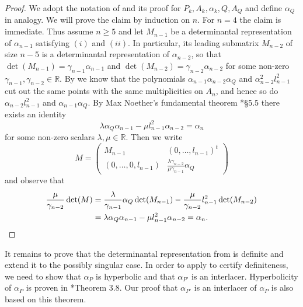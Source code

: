 \documentclass[a4paper,10pt]{amsart}
\theoremstyle{definition}
\theoremstyle{plain}
\newcommand{\R}{{\mathbb R}}
\begin{document}
\begin{proof}
 We adopt the notation of  and its proof for $P_k, A_k, \alpha_k, Q, A_Q$ and define $\alpha_Q$ in analogy. 
 We will prove the claim by induction on $n$. For $n=4$ the claim is immediate. Thus assume $n\geq5$ and let $M_{n-1}$ be a determinantal representation of $\alpha_{n-1}$ satisfying $(i)$ and $(ii)$. In particular, its leading submatrix $M_{n-2}$ of size $n-5$ is a determinantal representation of $\alpha_{n-2}$, so that $\det(M_{n-1}) = \gamma_{n-1}\alpha_{n-1}$ and $\det(M_{n-2}) = \gamma_{n-2}\alpha_{n-2}$ for some non-zero $\gamma_{n-1},\gamma_{n-2}\in\R$. 
 By  we know that the polynomials $\alpha_{n-1}\alpha_{n-2}\alpha_Q$ and $\alpha_{n-2}^2l_{n-1}^2$ cut out the same points with the same multiplicities on $A_n$, and hence so do $\alpha_{n-2}l_{n-1}^2$ and $\alpha_{n-1}\alpha_Q$. By Max Noether's fundamental theorem \cite{Fulton2008Curves}*{\S5.5} there exists an identity
 \begin{equation*}
     \lambda\alpha_Q\alpha_{n-1} - \mu l_{n-1}^2\alpha_{n-2} = \alpha_n
 \end{equation*}
 for some non-zero scalars $\lambda,\mu\in\R$.  Then we write
 \begin{equation*}
     M = \begin{pmatrix}
         M_{n-1} & (0, \dots, l_{n-1})^t \\
         (0, \dots, 0, l_{n-1}) & \frac{\lambda\gamma_{n-2}}{\mu\gamma_{n-1}}\alpha_Q
     \end{pmatrix}
 \end{equation*}
 and observe that
 \begin{equation*}
 \begin{split}
     \frac{\mu}{\gamma_{n-2}}\det(M) & = \frac{\lambda}{\gamma_{n-1}}\alpha_Q\det(M_{n-1}) - \frac{\mu}{\gamma_{n-2}}l_{n-1}^2\det(M_{n-2})  \\
     &= \lambda\alpha_Q\alpha_{n-1} - \mu l_{n-1}^2\alpha_{n-2} = \alpha_n.\qedhere
 \end{split}
 \end{equation*}
\end{proof}

It remains to prove that the determinantal representation from  is definite and extend it to the possibly singular case.
In order to apply  to certify definiteness, we need to show that $\alpha_P$ is hyperbolic and that $\alpha_{P'}$ is an interlacer. Hyperbolicity of $\alpha_P$ is proven in \cite{KohnEtAl2024AdjCurves}*{Theorem 3.8}. Our proof that $\alpha_{P'}$ is an interlacer of $\alpha_P$ is also based on this theorem. 
\end{document}
